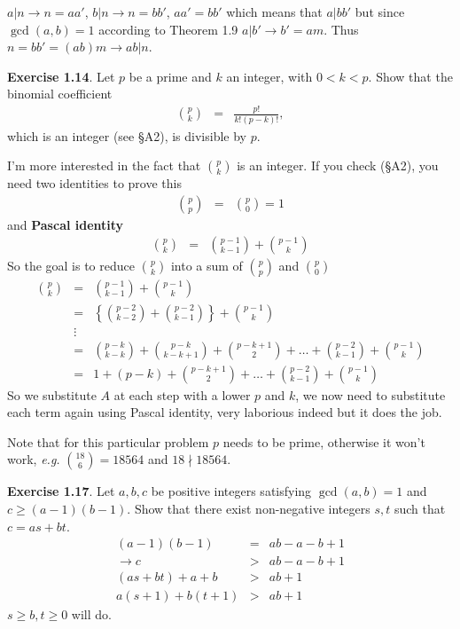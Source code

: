 \documentclass[aps,preprint,preprintnumbers,nofootinbib,showpacs,prd]{revtex4-1}
\newcommand{\eg}{{\it e.g.} }
\newcommand{\nbea}{\begin{eqnarray*}}
\newcommand{\neea}{\end{eqnarray*}}
\begin{document}
$a|n \to n = aa'$, $b|n \to n = bb'$, $aa'=bb'$ which means that $a|bb'$ but since $\gcd(a,b)=1$ according to Theorem 1.9 $a|b' \to b' = am$. Thus $n = bb' = (ab)m \to ab|n$.

{\bf Exercise 1.14}. Let $p$ be a prime and $k$ an integer, with $0 < k < p$. Show that the binomial coeﬃcient
%
\nbea
\binom{p}{k} & = & \frac{p!}{k! (p-k)!},
\neea
%
which is an integer (see \S A2), is divisible by $p$.

I'm more interested in the fact that $\binom{p}{k}$ is an integer. If you check  (\S A2), you need two identities to prove this
%
\nbea
\binom{p}{p} & = & \binom{p}{0} = 1
\neea
%
and {\bf Pascal identity}
%
\nbea
\binom{p}{k} & = & \binom{p - 1}{k - 1} + \binom{p - 1}{k}
\neea
%
So the goal is to reduce $\binom{p}{k}$ into a sum of $\binom{p}{p}$ and $\binom{p}{0}$
%
\nbea
\binom{p}{k} & = & \binom{p - 1}{k - 1} + \binom{p - 1}{k} \\
& = & \left \{ \binom{p - 2}{k - 2} + \binom{p - 2}{k - 1} \right \} + \binom{p - 1}{k} \\
& \vdots & \\
& = & \binom{p - k}{k - k} + \binom{p - k}{k - k + 1} + \binom{p - k + 1}{2} + \dots + \binom{p - 2}{k - 1} + \binom{p - 1}{k} \\
& = & 1 + (p - k) + \binom{p - k + 1}{2} + \dots + \binom{p - 2}{k - 1} + \binom{p - 1}{k}
\neea
%
So we substitute $A$ at each step with a lower $p$ and $k$, we now need to substitute each term again using Pascal identity, very laborious indeed but it does the job.

Note that for this particular problem $p$ needs to be prime, otherwise it won't work, \eg $\binom{18}{6} = 18564$ and $18 \nmid 18564$.

{\bf Exercise 1.17}.  Let $a, b, c$ be positive integers satisfying $\gcd(a, b) = 1$ and $c \ge (a - 1)(b - 1)$. Show that there exist non-negative integers $s, t$ such that $c = as + bt$.
%
\nbea
(a - 1)(b - 1) & = & ab - a - b + 1 \\
\to c & > & ab - a - b + 1 \\
(as + bt) + a + b & > & ab + 1 \\
a(s+1) + b(t + 1) & > & ab + 1
\neea
%
$s \ge b, t \ge 0$ will do.
\end{document}
